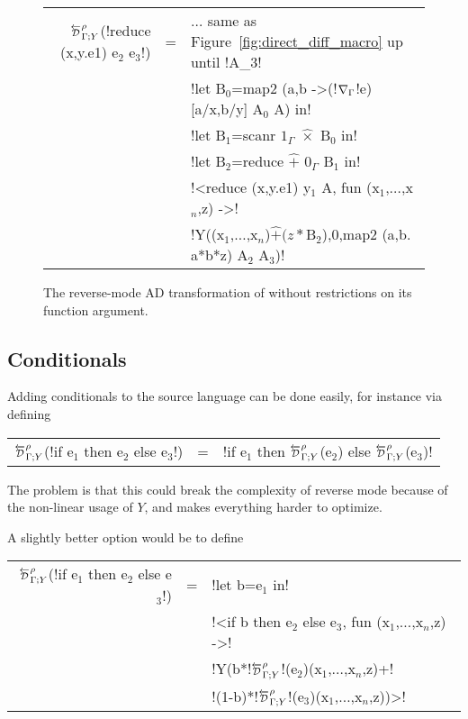 \begin{figure}

\begin{small}
\begin{tabular}{|r c l|}
\hline
$\directD{\rho}{\Gamma}{Y}$(!reduce (x,y.e1) e$_2$ e$_3$!) 
&=& $\ldots$ same as Figure~\ref{fig:direct_diff_macro} up until !A_$3$! \\
&& !let B$_0$=map2 (a,b ->(!$\nabla_\Gamma$!e)[a/x,b/y] A$_0$ A) in!\\
&& !let B$_1$=scanr $1_\Gamma$ $\widehat{\times}$ B$_0$ in! \\
&& !let B$_2$=reduce $\widehat{+}$ $0_\Gamma$ B$_1$ in! \\
&& !<reduce (x,y.e1) y$_1$ A, fun (x$_1$,$\ldots$,x$_n$,z) ->! \\
&& !Y((x$_1$,$\ldots$,x$_n$)$\widehat{+}(z*$B$_2$),0,map2 (a,b. a*b*z) A$_2$ A$_3$)! \\ \hline
\end{tabular}
\end{small}
\vspace{-0.4cm}
\caption{The reverse-mode AD transformation of  without restrictions on its function argument.}
\vspace{-0.4cm}
\label{fig:lift_reduce}
\end{figure}

\subsection{Conditionals} %
\label{sub:lift_conditional}

Adding conditionals to the source language can be done easily, for instance via defining

\begin{tabular}{r c l}
$\directD{\rho}{\Gamma}{Y}$(!if e$_1$ then e$_2$ else e$_3$!) &=& !if e$_1$ then $\directD{\rho}{\Gamma}{Y}$(e$_2$) else $\directD{\rho}{\Gamma}{Y}$(e$_3$)! 
\end{tabular}

The problem is that this could break the complexity of reverse mode because of the non-linear usage of $Y$, and makes everything harder to optimize.

A slightly better option would be to define 

\begin{tabular}{r c l}
    $\directD{\rho}{\Gamma}{Y}$(!if e$_1$ then e$_2$ else e$_3$!) 
    &=& !let b=e$_1$ in!   \\
    && !<if b then e$_2$ else e$_3$, fun (x$_1$,$\ldots$,x$_n$,z) ->! \\
    && !Y(b*!$\directD{\rho}{\Gamma}{Y}$!(e$_2$)(x$_1$,$\ldots$,x$_n$,z)+!\\
    && \quad!(1-b)*!$\directD{\rho}{\Gamma}{Y}$!(e$_3$)(x$_1$,$\ldots$,x$_n$,z))>!
\end{tabular}


